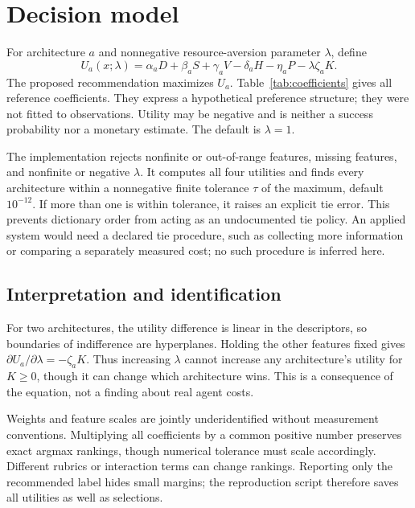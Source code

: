 \documentclass[11pt]{article}
\begin{document}
\section{Decision model}
For architecture $a$ and nonnegative resource-aversion parameter $\lambda$, define
\begin{equation}\label{eq:utility}
U_a(x;\lambda)=\alpha_aD+\beta_aS+\gamma_aV-\delta_aH-\eta_aP-\lambda\zeta_aK.
\end{equation}
The proposed recommendation maximizes $U_a$. Table~\ref{tab:coefficients} gives all reference coefficients. They express a hypothetical preference structure; they were not fitted to observations. Utility may be negative and is neither a success probability nor a monetary estimate. The default is $\lambda=1$.

\begin{table}[htbp]\centering
\caption{Hand-specified coefficients. Values are design hypotheses, not estimated effects.}\label{tab:coefficients}

\end{table}

The implementation rejects nonfinite or out-of-range features, missing features, and nonfinite or negative $\lambda$. It computes all four utilities and finds every architecture within a nonnegative finite tolerance $\tau$ of the maximum, default $10^{-12}$. If more than one is within tolerance, it raises an explicit tie error. This prevents dictionary order from acting as an undocumented tie policy. An applied system would need a declared tie procedure, such as collecting more information or comparing a separately measured cost; no such procedure is inferred here.

\subsection{Interpretation and identification}
For two architectures, the utility difference is linear in the descriptors, so boundaries of indifference are hyperplanes. Holding the other features fixed gives $\partial U_a/\partial\lambda=-\zeta_aK$. Thus increasing $\lambda$ cannot increase any architecture's utility for $K\geq0$, though it can change which architecture wins. This is a consequence of the equation, not a finding about real agent costs.

Weights and feature scales are jointly underidentified without measurement conventions. Multiplying all coefficients by a common positive number preserves exact argmax rankings, though numerical tolerance must scale accordingly. Different rubrics or interaction terms can change rankings. Reporting only the recommended label hides small margins; the reproduction script therefore saves all utilities as well as selections.
\end{document}
